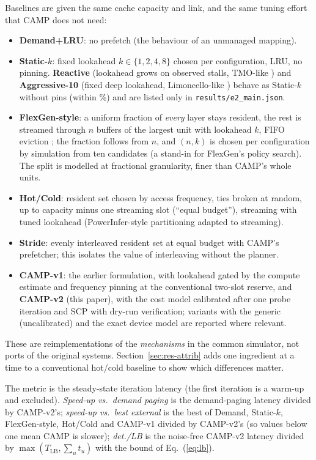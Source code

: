 \documentclass[preprint,12pt]{elsarticle}
\newcommand{\camp}{\textsc{CAMP}}
\begin{document}
Baselines are given the same cache capacity and link, and the same tuning effort that \camp{} does not need:
\begin{itemize}
\item \textbf{Demand+LRU}: no prefetch (the behaviour of an unmanaged mapping).
\item \textbf{Static-$k$}: fixed lookahead $k\in\{1,2,4,8\}$ chosen per configuration, LRU, no pinning. \textbf{Reactive} (lookahead grows on observed stalls, TMO-like \cite{tmo}) and \textbf{Aggressive-10} (fixed deep lookahead, Limoncello-like \cite{limoncello}) behave as Static-$k$ without pins (within \nReaOverSkMax\%) and are listed only in \texttt{results/e2\_main.json}.
\item \textbf{FlexGen-style}: a uniform fraction of \emph{every} layer stays resident, the rest is streamed through $n$ buffers of the largest unit with lookahead $k$, FIFO eviction \cite{sheng2023flexgen}; the fraction follows from $n$, and $(n,k)$ is chosen per configuration by simulation from ten candidates (a stand-in for FlexGen's policy search). The split is modelled at fractional granularity, finer than \camp's whole units.
\item \textbf{Hot/Cold}: resident set chosen by access frequency, ties broken at random, up to capacity minus one streaming slot (``equal budget''), streaming with tuned lookahead (PowerInfer-style partitioning \cite{song2024powerinfer} adapted to streaming).
\item \textbf{Stride}: evenly interleaved resident set at equal budget with \camp's prefetcher; this isolates the value of interleaving without the planner.
\item \textbf{\camp-v1}: the earlier formulation, with lookahead gated by the compute estimate and frequency pinning at the conventional two-slot reserve, and \textbf{\camp-v2} (this paper), with the cost model calibrated after one probe iteration and SCP with dry-run verification; variants with the generic (uncalibrated) and the exact device model are reported where relevant.
\end{itemize}
These are reimplementations of the \emph{mechanisms} in the common simulator, not ports of the original systems. Section~\ref{sec:res-attrib} adds one ingredient at a time to a conventional hot/cold baseline to show which differences matter.

The metric is the steady-state iteration latency (the first iteration is a warm-up and excluded). \emph{Speed-up vs.\ demand paging} is the demand-paging latency divided by \camp-v2's; \emph{speed-up vs.\ best external} is the best of Demand, Static-$k$, FlexGen-style, Hot/Cold and \camp-v1 divided by \camp-v2's (so values below one mean \camp{} is slower); \emph{det./LB} is the noise-free \camp-v2 latency divided by $\max(T_{\mathrm{LB}}, \sum_u t_u)$ with the bound of Eq.~(\ref{eq:lb}).
\end{document}
